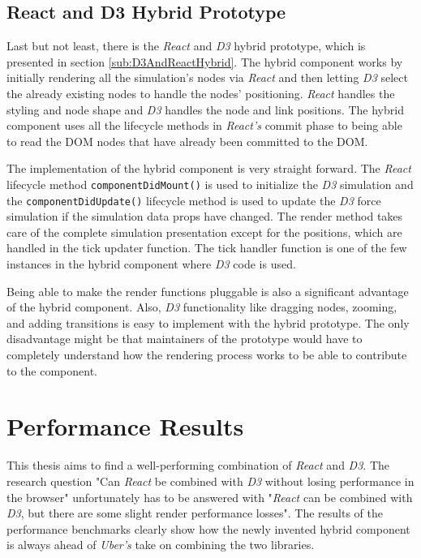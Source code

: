 \subsection{React and D3 Hybrid Prototype}

Last but not least, there is the \emph{React} and \emph{D3} hybrid prototype, which is presented in section \ref{sub:D3AndReactHybrid}. The hybrid component works by initially rendering all the simulation's nodes via \emph{React} and then letting \emph{D3} select the already existing nodes to handle the nodes' positioning. \emph{React} handles the styling and node shape and \emph{D3} handles the node and link positions. The hybrid component uses all the lifecycle methods in \emph{React's} commit phase to being able to read the DOM nodes that have already been committed to the DOM. 

The implementation of the hybrid component is very straight forward. The \emph{React} lifecycle method \texttt{componentDidMount()} is used to initialize the \emph{D3} simulation and the \texttt{componentDidUpdate()} lifecycle method is used to update the \emph{D3} force simulation if the simulation data props have changed. The render method takes care of the complete simulation presentation except for the positions, which are handled in the tick updater function. The tick handler function is one of the few instances in the hybrid component where \emph{D3} code is used.

Being able to make the render functions pluggable is also a significant advantage of the hybrid component. Also, \emph{D3} functionality like dragging nodes, zooming, and adding transitions is easy to implement with the hybrid prototype. The only disadvantage might be that maintainers of the prototype would have to completely understand how the rendering process works to be able to contribute to the component.

\section{Performance Results}

This thesis aims to find a well-performing combination of \emph{React} and \emph{D3}. The research question "Can \emph{React} be combined with \emph{D3} without losing performance in the browser" unfortunately has to be answered with "\emph{React} can be combined with \emph{D3}, but there are some slight render performance losses". The results of the performance benchmarks clearly show how the newly invented hybrid component is always ahead of \emph{Uber's} take on combining the two libraries. 

